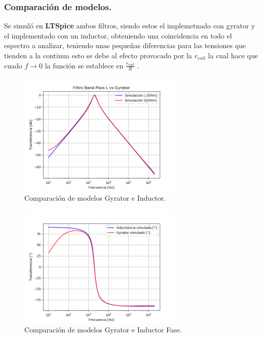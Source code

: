 \documentclass[a4paper]{article}
\begin{document}
\subsubsection{Comparación de modelos.}
Se simuló en \textbf{LTSpice} ambos filtros, siendo estos el implemetnado con gyrator y el implementado con un inductor, obteniendo una coincidencia en todo el espectro a analizar, teniendo unas pequeñas diferencias para las tensiones que tienden a la continua esto se debe al efecto provocado por la $r_{coil}$ la cual hace que cuado $f \rightarrow 0$ la función se establece en $\frac{r_{coil}}{R}$ .
\begin{figure}[H]	
	\centering
	\includegraphics[width=0.7\textwidth]{ImagenesEj2/simBP.PNG}
	\caption{Comparación de modelos Gyrator e Inductor.}
	\label{fig:gyrIndBP}
\end{figure}
\begin{figure}[H]	
	\centering
	\includegraphics[width=0.7\textwidth]{ImagenesEj2/simBPP.PNG}
	\caption{Comparación de modelos Gyrator e Inductor Fase.}
	\label{fig:gyrIndPBP}
\end{figure}
\end{document}
